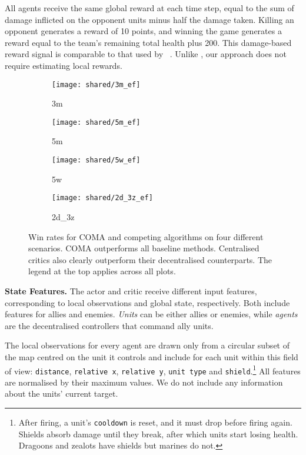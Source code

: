 \documentclass[letterpaper]{article}
\newcommand{\citet}[1]{\citeauthor{#1}~\shortcite{#1}}
\begin{document}
All agents receive the same global reward at each time step, equal to the sum of
damage inflicted on the opponent units minus half the damage taken. Killing an
opponent generates a reward of 10 points, and winning the game generates a
reward equal to the team's remaining total health plus 200. This damage-based
reward signal is comparable to that used by \citet{usunier2016episodic}. Unlike 
\cite{peng2017multiagent}, our approach does not require estimating local 
rewards.

 \begin{figure*}[t!]
 	\centering
 	\begin{subfigure}[b]{0.4\linewidth}
 		\texttt{[image: shared/3m\_ef]}
 		\caption{3m}
 	\end{subfigure}
  	\begin{subfigure}[b]{0.4\linewidth}
	\texttt{[image: shared/5m\_ef]}
 	\caption{5m}
 	\end{subfigure}
 	\begin{subfigure}[b]{0.4\linewidth}
	\texttt{[image: shared/5w\_ef]}
	\caption{5w}
	\end{subfigure}
 	\begin{subfigure}[b]{0.4\linewidth}
\texttt{[image: shared/2d\_3z\_ef]}
	\caption{2d\_3z}

	\end{subfigure}
 	\caption{Win rates for COMA and competing algorithms on four different 
 		scenarios. COMA outperforms all baseline methods. Centralised critics 
 		also
 		clearly outperform their decentralised counterparts. The legend at the 
 		top applies across all plots.}
 	\label{fig:fig_2}
 \end{figure*}

\textbf{State Features.}
\label{ssec:features}
The actor and critic receive different input features, corresponding to local
observations and global state, respectively. Both include features for allies
and enemies. \emph{Units} can be either allies or enemies, while \emph{agents} are
the decentralised controllers that command ally units.

The local observations for every agent are drawn only from a circular subset of
the map centred on the unit it controls and include for each unit within this 
field of view:
\texttt{distance}, \texttt{relative x}, \texttt{relative
y}, \texttt{unit type} and \texttt{shield}.\footnote{After firing, a unit's 
\texttt{cooldown} is reset, and it must drop
before firing again. Shields absorb damage until they break, after which units
start losing health. Dragoons and zealots have shields but marines do not.}
All features are normalised by their maximum values. We do not include any 
information about the units' current target.
\end{document}
